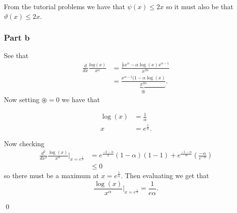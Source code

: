 \documentclass{unswmaths}
\begin{document}
From the tutorial problems we have that $ \psi(x) \leq 2x $ so it must also be that $ \vartheta(x) \leq 2x $.


\subsubsection*{Part b}

See that 
\begin{align*}
	\frac{d}{dx} \frac{log(x)}{x^\alpha} &= \frac{\frac{1}{x} x^\alpha - \alpha \log(x) x^{\alpha-1}}{x^{2\alpha}} \\
		&= \underbrace{\frac{x^{\alpha-1}( 1 - \alpha \log(x)}{x^{2 \alpha}}}_{\circledast}.
\end{align*}
Now setting $ \circledast = 0 $
we have that 

\begin{align*}
	\log(x) &= \frac{1}{\alpha} \\
	x &= e^{\frac{1}{\alpha}}.
\end{align*}


Now checking
\begin{align*}
	\frac{d^2}{dx^2} \frac{\log(x)}{x^\alpha} \Big|_{x = e^{\frac{1}{\alpha}}} &= e^{\frac{-2-\alpha}{2}}(1-\alpha)(1 - 1) + e^\frac{-1-\alpha}{\alpha}\left( \frac{-\alpha}{e^{-\alpha}} \right) \\
	&\leq 0 
\end{align*}
so there must be a maximum at $ x = e^\frac{1}{\alpha} $. Then evaluating we get that
$$
	\frac{\log(x)}{x^\alpha} \Big|_{x = e^\frac{1}{\alpha}} = \frac{1}{e\alpha}.
$$

\qed
\end{document}
